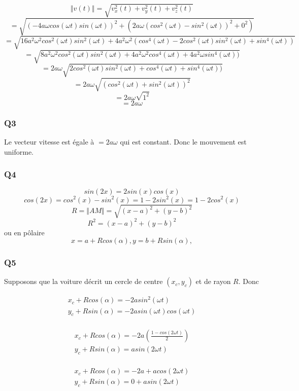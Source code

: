 \documentclass[]{book}
\theoremstyle{definition}
\begin{document}
$$\Vert v(t) \Vert = \sqrt{v_x^2(t) + v_y^2(t) + v_z^2(t)} $$
$$= \sqrt{(-4a\omega cos(\omega t) sin(\omega t))^ 2 + (2a\omega
  (cos^2(\omega t) - sin^2(\omega t))^2 + 0^2)}$$
$$= \sqrt{16a^2\omega^2 cos^2(\omega t) sin^2(\omega t) +
  4a^2\omega^2(cos^4(\omega t)-2cos^2(\omega t)sin^2(\omega t) + sin^4(\omega t))}$$
$$= \sqrt{8a^2\omega^2 cos^2(\omega t) sin^2(\omega t) +
  4a^2\omega^2cos^4(\omega t)+ 4a^2\omega sin^4(\omega t))}$$
$$= 2a\omega \sqrt{2cos^2(\omega t) sin^2(\omega t) +
  cos^4(\omega t)+ sin^4(\omega t))}$$
$$= 2a\omega \sqrt{(cos^2(\omega t) +sin^2(\omega t))^2}$$
$$= 2a\omega \sqrt{1^2}$$
$$= 2a\omega$$

\subsubsection*{Q3}
Le vecteur vitesse est \'egale \`a $= 2a\omega$ qui est constant. Donc
le mouvement est uniforme.

\subsubsection*{Q4}
$$sin(2x) = 2sin(x)cos(x)$$
$$cos(2x) = cos^2(x)-sin^2(x) = 1 - 2 sin^2(x) =  1 - 2 cos^2(x)$$
$$R=\Vert AM \Vert = \sqrt{(x-a)^2 + (y-b)^2}$$
$$R^2=(x-a)^2 + (y-b)^2$$
ou en p\^olaire
$$ x = a + Rcos(\alpha), y = b + Rsin(\alpha), $$


\subsubsection*{Q5}
Supposons que la voiture d\'ecrit un cercle de centre $(x_c, y_c)$ et
de rayon $R$. Donc

$$
\begin{array}{l} 
  x_c + Rcos(\alpha) = -2asin^2( \omega t)\\
  y_c + Rsin(\alpha)= -2asin( \omega t)cos( \omega t)\\
\end{array}
$$

$$
\begin{array}{l} 
  x_c + Rcos(\alpha) = -2a(\frac{1-cos(2 \omega t)}{2})\\
  y_c + Rsin(\alpha)= asin( 2 \omega t)\\
\end{array}
$$

$$
\begin{array}{l} 
  x_c + Rcos(\alpha) = -2a + acos(2 \omega t)\\
  y_c + Rsin(\alpha)= 0+ asin( 2 \omega t)\\
\end{array}
$$
\end{document}

